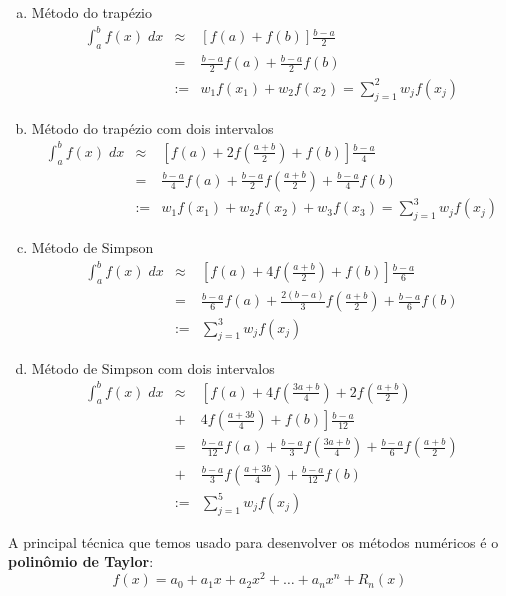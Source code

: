 \begin{ex}
\begin{enumerate}[a)]
\item Método do trapézio
\begin{eqnarray*}
\int_a^b f(x)\;dx &\approx& \left[f(a)+f(b)\right]\frac{b-a}{2}\\
&=&\frac{b-a}{2}f(a)+\frac{b-a}{2}f(b)\\
&:=&w_1f(x_1)+w_2f(x_2)= \sum_{j=1}^2 w_j f(x_j)
\end{eqnarray*}

\item Método do trapézio com dois intervalos
\begin{eqnarray*}
\int_a^b f(x)\;dx &\approx& \left[f(a)+2f\left(\frac{a+b}{2}\right)+f(b)\right]\frac{b-a}{4}\\
&=&\frac{b-a}{4}f(a)+\frac{b-a}{2}f\left(\frac{a+b}{2}\right)+\frac{b-a}{4}f(b)\\
&:=&w_1f(x_1)+w_2f(x_2)+w_3f(x_3)= \sum_{j=1}^3 w_j f(x_j)
\end{eqnarray*}

\item Método de Simpson
\begin{eqnarray*}
\int_a^b f(x)\;dx &\approx& \left[f(a)+4f\left(\frac{a+b}{2}\right)+f(b)\right]\frac{b-a}{6}\\
&=&\frac{b-a}{6}f(a)+\frac{2(b-a)}{3}f\left(\frac{a+b}{2}\right)+\frac{b-a}{6}f(b)\\
&:=&\sum_{j=1}^3 w_j f(x_j)
\end{eqnarray*}

\item Método de Simpson com dois intervalos
\begin{eqnarray*}
\int_a^b f(x)\;dx &\approx& \left[f(a)+4f\left(\frac{3a+b}{4}\right)+2f\left(\frac{a+b}{2}\right)\right.\\
&+& \left. 4f\left(\frac{a+3b}{4}\right)+f(b)\right]\frac{b-a}{12}\\
&=&\frac{b-a}{12}f(a)+\frac{b-a}{3}f\left(\frac{3a+b}{4}\right)+\frac{b-a}{6}f\left(\frac{a+b}{2}\right)\\
&+&\frac{b-a}{3}f\left(\frac{a+3b}{4}\right)+\frac{b-a}{12}f(b)\\
&:=&\sum_{j=1}^5 w_j f(x_j)
\end{eqnarray*}

\end{enumerate}
\end{ex}

A principal técnica que temos usado para desenvolver os métodos numéricos é o {\bf polinômio de Taylor}:
$$f(x)=a_0+a_1x + a_2x^2+\ldots + a_n x^n +R_n(x)$$

